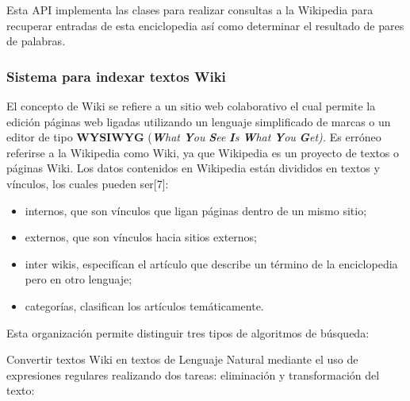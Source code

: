 \documentclass[letterpaper]{article}
\newcommand\liststyleLxviii{%
\renewcommand\labelitemi{{\textbullet}}
\renewcommand\labelitemii{${\circ}$}
\renewcommand\labelitemiii{${\blacksquare}$}
\renewcommand\labelitemiv{{\textbullet}}
}
\newcommand\liststyleLxix{%
\renewcommand\labelitemi{{\textbullet}}
\renewcommand\labelitemii{${\circ}$}
\renewcommand\labelitemiii{${\blacksquare}$}
\renewcommand\labelitemiv{{\textbullet}}
}
\begin{document}
\bigskip

{\sffamily
Esta API implementa las clases para realizar consultas a la Wikipedia
para recuperar entradas de esta enciclopedia as\'i como determinar el
resultado de pares de palabras.}


\bigskip

\subsubsection[Sistema para indexar textos Wiki]{Sistema para indexar
textos Wiki}
\hypertarget{RefHeading10804782078703}{}
\bigskip

{\sffamily
El concepto de Wiki se refiere a un sitio web colaborativo el cual
permite la edici\'on p\'aginas web ligadas utilizando un lenguaje
simplificado de marcas o un editor de tipo \textbf{WYSIWYG}
(\textbf{\textit{W}}\textit{hat }\textbf{\textit{Y}}\textit{ou
}\textbf{\textit{S}}\textit{ee }\textbf{\textit{I}}\textit{s
}\textbf{\textit{W}}\textit{hat }\textbf{\textit{Y}}\textit{ou
}\textbf{\textit{G}}\textit{et). }Es err\'oneo referirse a la Wikipedia
como Wiki, ya que Wikipedia es un proyecto de textos o p\'aginas Wiki.
Los datos contenidos en Wikipedia est\'an divididos en textos y
v\'inculos, los cuales pueden ser[7]: }


\bigskip

\liststyleLxviii
\begin{itemize}
\item {\sffamily
internos, que son v\'inculos que ligan p\'aginas dentro de un mismo
sitio;}
\end{itemize}
\liststyleLxix
\begin{itemize}
\item {\sffamily
externos, que son v\'inculos hacia sitios externos;}
\item {\sffamily
inter wikis, especif\'ican el art\'iculo que describe un t\'ermino de la
enciclopedia pero en otro lenguaje;}
\item {\sffamily
categor\'ias, clasifican los art\'iculos tem\'aticamente.}
\end{itemize}

\bigskip

{\sffamily
Esta organizaci\'on permite distinguir tres tipos de algoritmos de
b\'usqueda:}

{\sffamily
Convertir textos Wiki en textos de Lenguaje Natural mediante el uso de
expresiones regulares realizando dos tareas: eliminaci\'on y
transformaci\'on del texto:}
\end{document}
